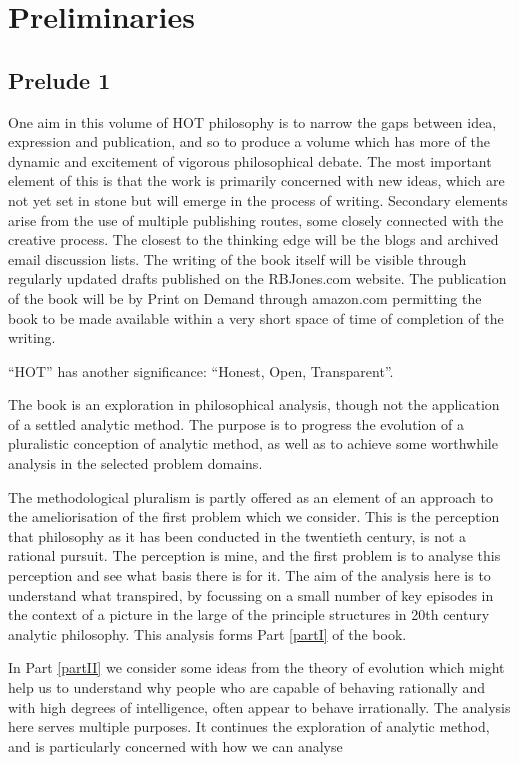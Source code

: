 \mainmatter

\newtheorem{iprin}{I}

\part{Preliminaries}\label{part0}

\chapter{Prelude 1}

One aim in this volume of HOT philosophy is to narrow the gaps between idea, expression and publication, and so to produce a volume which has more of the dynamic and excitement of vigorous philosophical debate.
The most important element of this is that the work is primarily concerned with new ideas, which are not yet set in stone but will emerge in the process of writing.
Secondary elements arise from the use of multiple publishing routes, some closely connected with the creative process.
The closest to the thinking edge will be the blogs and archived email discussion lists.
The writing of the book itself will be visible through regularly updated drafts published on the RBJones.com website.
The publication of the book will be by Print on Demand through amazon.com permitting the book to be made available within a very short space of time of completion of the writing.

``HOT'' has another significance: ``Honest, Open, Transparent''.

The book is an exploration in philosophical analysis, though not the application of a settled analytic method.
The purpose is to progress the evolution of a pluralistic conception of analytic method, as well as to achieve some worthwhile analysis in the selected problem domains.

The methodological pluralism is partly offered as an element of an approach to the ameliorisation of the first problem which we consider.
This is the perception that philosophy as it has been conducted in the twentieth century, is not a rational pursuit.
The perception is mine, and the first problem is to analyse this perception and see what basis there is for it.
The aim of the analysis here is to understand what transpired, by focussing on a small number of key episodes in the context of a picture in the large of the principle structures in 20th century analytic philosophy.
This analysis forms Part \ref{partI} of the book.

In Part \ref{partII} we consider some ideas from the theory of evolution which might help us to understand why people who are capable of behaving rationally and with high degrees of intelligence, often appear to behave irrationally.
The analysis here serves multiple purposes.
It continues the exploration of analytic method, and is particularly concerned with how we can analyse 

